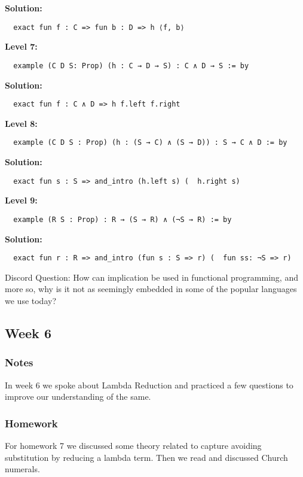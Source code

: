 \documentclass{article}
\theoremstyle{theorem}
\theoremstyle{definition}
\theoremstyle{remark}
\begin{document}
\begin{enumerate}
  \textbf{Solution:}
  \begin{verbatim}
  exact fun f : C => fun b : D => h ⟨f, b⟩
  \end{verbatim}

  \textbf{Level 7:}
  \begin{verbatim}
  example (C D S: Prop) (h : C → D → S) : C ∧ D → S := by
  \end{verbatim}

  \textbf{Solution:}
  \begin{verbatim}
  exact fun f : C ∧ D => h f.left f.right
  \end{verbatim}

  \textbf{Level 8:}
  \begin{verbatim}
  example (C D S : Prop) (h : (S → C) ∧ (S → D)) : S → C ∧ D := by
  \end{verbatim}

  \textbf{Solution:}
  \begin{verbatim}
  exact fun s : S => and_intro (h.left s) (  h.right s)
  \end{verbatim}

  \textbf{Level 9:}
  \begin{verbatim}
  example (R S : Prop) : R → (S → R) ∧ (¬S → R) := by
  \end{verbatim}

  \textbf{Solution:}
  \begin{verbatim}
  exact fun r : R => and_intro (fun s : S => r) (  fun ss: ¬S => r)
  \end{verbatim}
\end{enumerate}

Discord Question: How can implication be used in functional programming, and more so, why is it not as seemingly embedded in some of the popular languages we use today?

\subsection{Week 6}
\subsubsection*{Notes}
In week 6 we spoke about Lambda Reduction and practiced a few questions to improve our understanding of the same.

\subsubsection*{Homework}
For homework 7 we discussed some theory related to capture avoiding substitution by reducing a lambda term. Then we read and discussed Church numerals.
\end{document}
